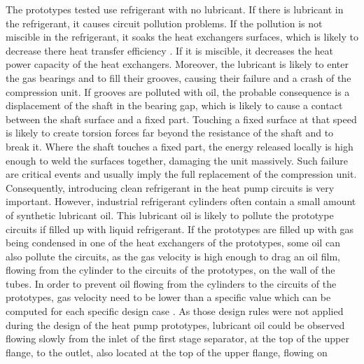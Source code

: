 The prototypes tested use refrigerant with no lubricant. If there is
lubricant in the refrigerant, it causes circuit pollution problems. If
the pollution is not miscible in the refrigerant, it soaks the heat
exchangers surfaces, which is likely to decrease there heat transfer
efficiency \citep{BandarraFilho-Thome-2009a}. If it is miscible, it
decreases the heat power capacity of the heat exchangers. Moreover,
the lubricant is likely to enter the gas bearings and to fill their
grooves, causing their failure and a crash of the compression unit. If
grooves are polluted with oil, the probable consequence is a
displacement of the shaft in the bearing gap, which is likely to cause
a contact between the shaft surface and a fixed part. Touching a fixed
surface at that speed is likely to create torsion forces far beyond
the resistance of the shaft and to break it. Where the shaft touches a
fixed part, the energy released locally is high enough to weld the
surfaces together, damaging the unit massively. Such failure are
critical events and usually imply the full replacement of the
compression unit. Consequently, introducing clean refrigerant in the
heat pump circuits is very important. However, industrial refrigerant
cylinders often contain a small amount of synthetic lubricant
oil. This lubricant oil is likely to pollute the prototype circuits if
filled up with liquid refrigerant. If the prototypes are filled up with gas being
condensed in one of the heat exchangers of the prototypes, some oil
can also pollute the circuits, as the gas velocity is high enough to
drag an oil film, flowing from the cylinder to the circuits of the
prototypes, on the wall of the tubes. In order to prevent oil flowing
from the cylinders to the circuits of the prototypes, gas velocity
need to be lower than a specific value which can be computed for each
specific design case \citep{kesim-ileri-2000a,Guo-Shen-2011a}. As
those design rules were not applied during the design of the heat pump
prototypes, lubricant oil could be observed flowing slowly from the
inlet of the first stage separator, at the top of the upper flange, to
the outlet, also located at the top of the upper flange, flowing on
